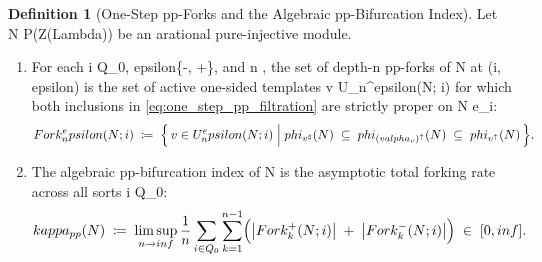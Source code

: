 \documentclass[11pt,a4paper,reqno]{amsart}
\def\({}%
\def\){}%
\def\mathcal#1{#1}%
\def\mathrm#1{#1}%
\def\operatorname#1{#1}%
\def\Zg{Z}%
\def\subset{\subseteq}%
\def\subsetneq{\subset}%
\def\infty{inf}%
\def\kappa{kappa}%
\def\alpha{alpha}%
\def\epsilon{epsilon}%
\def\phi{phi}%
\def\Lambda{Lambda}%
\def\emph#1{#1}%
\theoremstyle{definition}
\newtheorem{definition}[theorem]{Definition}
\theoremstyle{remark}
\newcommand{\Zg}{\operatorname{Zg}}
\begin{document}
\begin{definition}[One-Step pp-Forks and the Algebraic pp-Bifurcation Index]
\label{def:pp_bifurcation_index}
Let \(N \in \mathcal{P}(\Zg(\Lambda))\) be an arational pure-injective module.
\begin{enumerate}
    \item For each \(i \in Q_0\), \(\epsilon \in \{-, +\}\), and \(n \), the set of \emph{depth-\(n\) pp-forks} of \(N\) at \((i, \epsilon)\) is the set of active one-sided templates \(v \in \mathcal{U}_n^\epsilon(N; i)\) for which both inclusions in \eqref{eq:one_step_pp_filtration} are strictly proper on \(N e_i\):
    \[
    \operatorname{Fork}_n^\epsilon(N; i) \;\coloneqq\; \Bigl\{\, v \in \mathcal{U}_n^\epsilon(N; i) \;\Big|\; \phi_{v^\sharp}(N) \;\subsetneq\; \phi_{(v\alpha_v)^\uparrow}(N) \;\subsetneq\; \phi_{v^\uparrow}(N) \,\Bigr\}.
    \]
    \item The \emph{algebraic pp-bifurcation index} of \(N\) is the asymptotic total forking rate across all sorts \(i \in Q_0\):
    \[
    \kappa_{\mathrm{pp}}(N) \;\coloneqq\; \limsup_{n \to \infty} \frac{1}{n} \sum_{i \in Q_0} \sum_{k=1}^{n-1} \Bigl(\bigl|\operatorname{Fork}_k^+(N; i)\bigr| \;+\; \bigl|\operatorname{Fork}_k^-(N; i)\bigr|\Bigr) \;\in\; [0, \infty].
    \]
\end{enumerate}
\end{definition}
\end{document}
